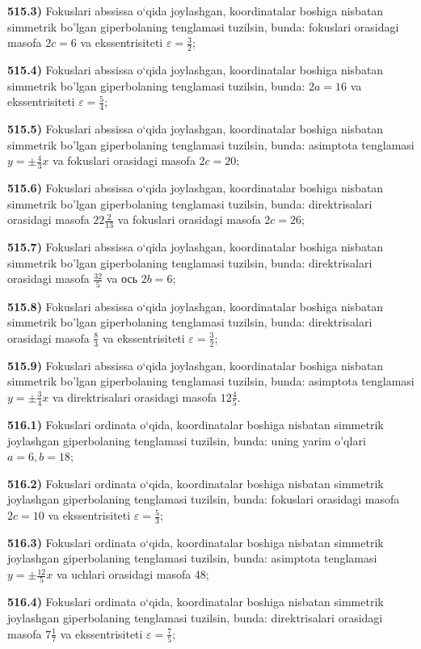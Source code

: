 \textbf{515.3)} Fokuslari abssissa o‘qida joylashgan, koordinatalar boshiga nisbatan simmetrik bo'lgan giperbolaning tenglamasi tuzilsin, bunda: fokuslari orasidagi masofa $2 c=6$ va ekssentrisiteti $\varepsilon=\frac{3}{2}$;

\textbf{515.4)} Fokuslari abssissa o‘qida joylashgan, koordinatalar boshiga nisbatan simmetrik bo'lgan giperbolaning tenglamasi tuzilsin, bunda: $2 a=16$ va ekssentrisiteti $\varepsilon=\frac{5}{4}$;

\textbf{515.5)} Fokuslari abssissa o‘qida joylashgan, koordinatalar boshiga nisbatan simmetrik bo'lgan giperbolaning tenglamasi tuzilsin, bunda: asimptota tenglamasi $y= \pm \frac{4}{3} x$ va fokuslari orasidagi masofa $2 c=20$;

\textbf{515.6)} Fokuslari abssissa o‘qida joylashgan, koordinatalar boshiga nisbatan simmetrik bo'lgan giperbolaning tenglamasi tuzilsin, bunda: direktrisalari orasidagi masofa $22 \frac{2}{13}$ va fokuslari orasidagi masofa $2 c=26$;

\textbf{515.7)} Fokuslari abssissa o‘qida joylashgan, koordinatalar boshiga nisbatan simmetrik bo'lgan giperbolaning tenglamasi tuzilsin, bunda: direktrisalari orasidagi masofa $\frac{32}{5}$ va ось $2 b=6$;

\textbf{515.8)} Fokuslari abssissa o‘qida joylashgan, koordinatalar boshiga nisbatan simmetrik bo'lgan giperbolaning tenglamasi tuzilsin, bunda: direktrisalari orasidagi masofa $\frac{8}{3}$ va ekssentrisiteti $\varepsilon=\frac{3}{2}$;

\textbf{515.9)} Fokuslari abssissa o‘qida joylashgan, koordinatalar boshiga nisbatan simmetrik bo'lgan giperbolaning tenglamasi tuzilsin, bunda: asimptota tenglamasi $y= \pm \frac{3}{4} x$ va direktrisalari orasidagi masofa $12 \frac{4}{5}$.

\textbf{516.1)} Fokuslari ordinata o‘qida, koordinatalar boshiga nisbatan simmetrik joylashgan giperbolaning tenglamasi tuzilsin, bunda: uning yarim o'qlari $a=6, b=18$;

\textbf{516.2)} Fokuslari ordinata o‘qida, koordinatalar boshiga nisbatan simmetrik joylashgan giperbolaning tenglamasi tuzilsin, bunda: fokuslari orasidagi masofa $2 c=10$ va ekssentrisiteti $\varepsilon=\frac{5}{3}$;

\textbf{516.3)} Fokuslari ordinata o‘qida, koordinatalar boshiga nisbatan simmetrik joylashgan giperbolaning tenglamasi tuzilsin, bunda: asimptota tenglamasi $y= \pm \frac{12}{5} x$ va uchlari orasidagi masofa 48;

\textbf{516.4)} Fokuslari ordinata o‘qida, koordinatalar boshiga nisbatan simmetrik joylashgan giperbolaning tenglamasi tuzilsin, bunda: direktrisalari orasidagi masofa $7 \frac{1}{7}$ va ekssentrisiteti $\varepsilon=\frac{7}{5}$;

